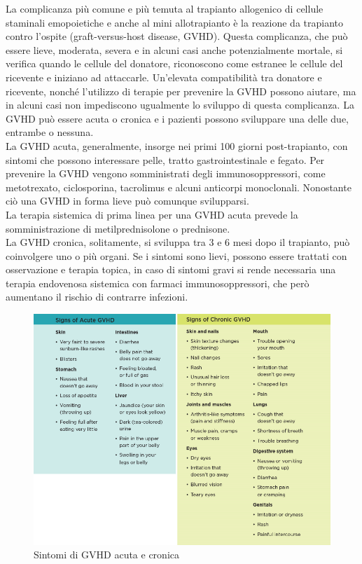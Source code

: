 La complicanza più comune e più temuta al trapianto allogenico di cellule staminali emopoietiche e anche al mini 
allotrapianto è la reazione da trapianto contro l’ospite (graft-versus-host disease, GVHD). Questa complicanza, 
che può essere lieve, moderata, severa e in alcuni casi anche potenzialmente mortale, si verifica quando le cellule 
del donatore, riconoscono come estranee le cellule del ricevente e iniziano ad attaccarle. Un’elevata compatibilità 
tra donatore e ricevente, nonché l’utilizzo di terapie per prevenire la GVHD possono aiutare, ma in alcuni casi non 
impediscono ugualmente lo sviluppo di questa complicanza. 
La GVHD può essere acuta o cronica e i pazienti possono sviluppare una delle due, entrambe o nessuna\cite{LLSBLOOD}.\\
La GVHD acuta, generalmente, insorge nei primi 100 giorni post-trapianto, con sintomi che possono interessare pelle, 
tratto gastrointestinale e fegato. Per prevenire la GVHD vengono somministrati degli immunosoppressori, come 
metotrexato, ciclosporina, tacrolimus e alcuni anticorpi monoclonali. 
Nonostante ciò una GVHD in forma lieve può comunque svilupparsi\cite{STEMCELLS}.\\
La terapia sistemica di prima linea per una GVHD acuta prevede la somministrazione di metilprednisolone o prednisone\cite{GVHD}.\\
La GVHD cronica, solitamente, si sviluppa tra 3 e 6 mesi dopo il trapianto, può coinvolgere uno o più organi. 
Se i sintomi sono lievi, possono essere trattati con osservazione e terapia topica, in caso di sintomi gravi si rende 
necessaria una terapia endovenosa sistemica con farmaci immunosoppressori, che però aumentano il rischio 
di contrarre infezioni\cite{STEMCELLS}.\\

\begin{figure}[H]
    \begin{center}
    \includegraphics[width=0.8\columnwidth]{img/SignsGVHD.png}
    \end{center}
    \caption[Sintomi di GVHD acuta e cronica]{Sintomi di GVHD acuta e cronica
    \cite{img38}}

\end{figure}


